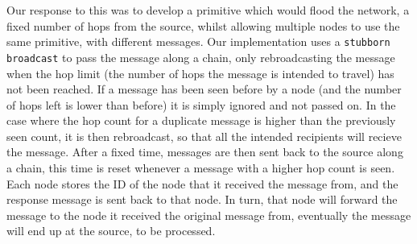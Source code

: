 Our response to this was to develop a primitive which would flood the network, a fixed number of hops from the source, whilst allowing multiple nodes to use the same primitive, with different messages. Our implementation uses a \verb|stubborn broadcast| to pass the message along a chain, only rebroadcasting the message when the hop limit (the number of hops the message is intended to travel) has not been reached. If a message has been seen before by a node (and the number of hops left is lower than before) it is simply ignored and not passed on. In the case where the hop count for a 
duplicate message is higher than the previously seen count, it is then rebroadcast, so that all the intended recipients will recieve the message.  
After a fixed time, messages are then sent back to the source along a chain, this time is reset whenever a message with a higher hop count is seen.  Each node stores the ID of the node that it received the message from, and the response message is sent back to that node. In turn, that node will forward the message to the node it received the original message from, eventually the message will end up at the source, to be processed.


